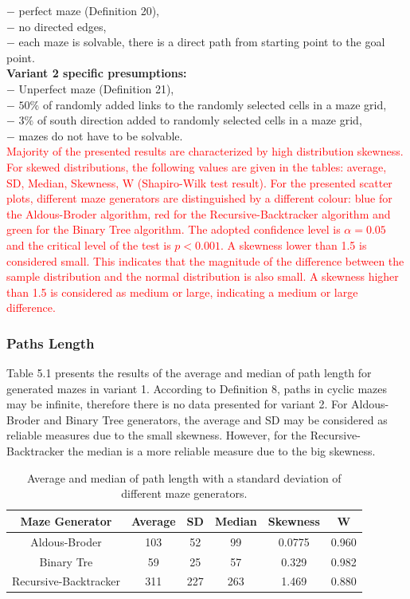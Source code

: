 $-$ perfect maze (Definition 20),\\
$-$ no directed edges,\\
$-$ each maze is solvable, there is a direct path from starting point to the goal point.\\
\newpage
\textbf{Variant 2 specific presumptions: }\\
$-$ Unperfect maze (Definition 21),\\
$-$ $50\%$ of randomly added links to the randomly selected cells in a maze grid,\\
$-$ $3\%$ of south direction added to randomly selected cells in a maze grid,\\
$-$ mazes do not have to be solvable.\\
\textcolor{red}{Majority of the presented results are characterized by high distribution skewness. For skewed distributions, the following values ​​are given in the tables:
average, SD, Median, Skewness, W (Shapiro-Wilk test result). For the presented scatter plots, different maze generators are distinguished by a different colour:
blue for the Aldous-Broder algorithm, red for the Recursive-Backtracker algorithm and green for the Binary Tree algorithm. The adopted confidence level is $\alpha = 0.05$ and 
the critical level of the test is $p<0.001$. A skewness lower than 1.5 is considered small. This indicates that the magnitude of the difference between the
sample distribution and the normal distribution is also small. A skewness higher than 1.5 is considered as medium or large, indicating a medium or large difference.}\\
\subsubsection{Paths Length}
Table 5.1 presents the results of the average and median of path length for generated mazes in variant 1.
According to Definition 8, paths in cyclic mazes may be infinite, therefore there is no data presented for variant 2. For Aldous-Broder and Binary Tree
generators, the average and SD may be considered as reliable measures due to the small skewness. However, for the Recursive-Backtracker the median is a more 
reliable measure due to the big skewness.
   
    \begin{table}[!ht]
        \centering
        \caption{Average and median of path length with a standard deviation of different maze generators.}
        \begin{tabular}{c c c c c c}
        \hline
            Maze Generator & Average & SD & Median & Skewness & W\\ \hline
            Aldous-Broder & 103 & 52 & 99 & 0.0775 & 0.960\\ 
            Binary Tre & 59 & 25 & 57 & 0.329 & 0.982\\ 
            Recursive-Backtracker & 311 & 227 & 263 & 1.469 & 0.880\\ \hline
        \end{tabular}
    \end{table}
